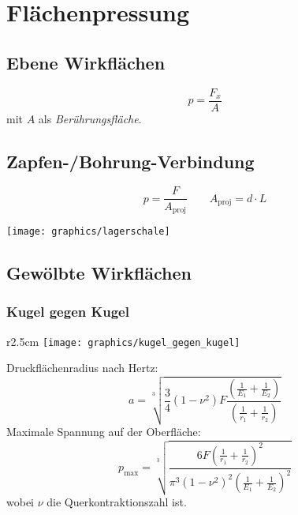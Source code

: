 \section{Flächenpressung} %
	\subsection{Ebene Wirkflächen} %
		\begin{equation*}
			p = \frac{F_x}{A}
		\end{equation*}
		mit $A$ als \emph{Berührungsfläche}.
	\subsection{Zapfen-/Bohrung-Verbindung} %
		\begin{equation*}
			p = \frac{F}{A_\text{proj}} \qquad A_\text{proj} = d\cdot L
		\end{equation*}
		\vspace{-2cm}
		\begin{flushright}
			\texttt{[image: graphics/lagerschale]}
		\end{flushright}
	\subsection{Gewölbte Wirkflächen} %
		\subsubsection{Kugel gegen Kugel} %
			
			\begin{wrapfigure}[5]{r}{2.5cm}
				\vspace{-2cm}
				\texttt{[image: graphics/kugel\_gegen\_kugel]}
			\end{wrapfigure}
		
			Druckflächenradius nach Hertz:
			\begin{equation*}
				a = \sqrt[3]{\frac{3}{4}(1-\nu^2)F\frac{\left( \frac{1}{E_1}+\frac{1}{E_2}\right)}{\left( \frac{1}{r_1}+ \frac{1}{r_2}\right)}}
			\end{equation*}
			Maximale Spannung auf der Oberfläche:
			\begin{equation*}
				p_{\text{max}}=\sqrt[3]{\frac{6F\left( \frac{1}{r_1}+ \frac{1}{r_2}\right)^2}{\pi^3(1-\nu^2)^2\left( \frac{1}{E_1}+\frac{1}{E_2}\right)^2}}
			\end{equation*}
			wobei $\nu$ die Querkontraktionszahl ist. 

